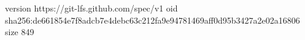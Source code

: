 version https://git-lfs.github.com/spec/v1
oid sha256:de661854e7f8adcb7e4debc63c212fa9e94781469aff0d95b3427a2e02a16806
size 849
